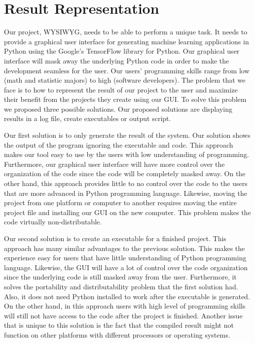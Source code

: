 \documentclass[journal,10pt,onecolumn,compsoc]{IEEEtran} \usepackage[margin=1.0in]{geometry} \usepackage{pdfpages} \usepackage{graphicx}
\begin{document}
\section{Result Representation}
Our project, WYSIWYG, needs to be able to perform a unique task. 
It needs to provide a graphical user interface for generating machine learning applications in Python using the Google's TensorFlow library for Python. 
Our graphical user interface will mask away the underlying Python code in order to make the development seamless for the user. 
Our users' programming skills range from low (math and statistic majors) to high (software developers). 
The problem that we face is to how to represent the result of our project to the user and maximize their benefit from the projects they create using our GUI. 
To solve this problem we proposed three possible solutions. 
Our proposed solutions are displaying results in a log file, create executables or output script.

\noindent Our first solution is to only generate the result of the system. 
Our solution shows the output of the program ignoring the executable and code. 
This approach makes our tool easy to use by the users with low understanding of  programming. 
Furthermore, our graphical user interface will have more control over the organization of the code since the code will be completely masked away. 
On the other hand, this approach provides little to no control over the code to the users that are more advanced in Python programming language. 
Likewise, moving the project from one platform or computer to another requires moving the entire project file and installing our GUI on the new computer. 
This problem makes the code virtually non-distributable.

\noindent Our second solution is to create an executable for a finished project. 
This approach has many similar advantages to the previous solution. 
This makes the experience easy for users that have little understanding of Python programming language. 
Likewise, the GUI will have a lot of control over the code organization since the underlying code is still masked away from the user. 
Furthermore, it solves the portability and distributability problem that the first solution had. 
Also, it does not need Python installed to work after the executable is generated. 
On the other hand, in this approach users with high level of programming skills will still not have access to the code after the project is finished. 
Another issue that is unique to this solution is the fact that the compiled result might not function on other platforms with different processors or operating systems.
\end{document}
